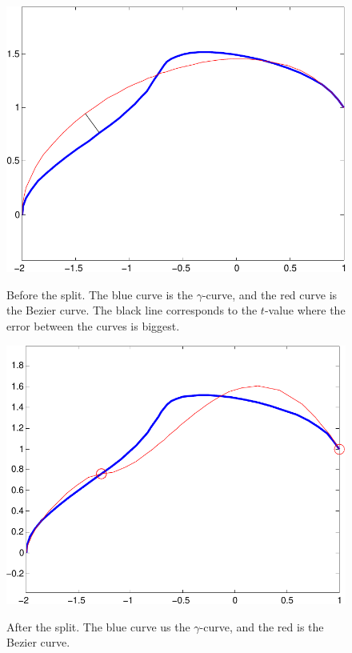 \documentclass[10pt]{article}
\begin{document}
\begin{figure}
\centering
\begin{minipage}[t]{.4\textwidth}
\centering
\vspace{0pt}
    \includegraphics[scale=0.5]{kurvedeling1-crop.pdf}
    \label{fig:kurvedeling1}
    \caption{Before the split. The blue curve is the $\gamma$-curve, and the red curve is the Bezier curve. The black line corresponds to the $t$-value where the error between the curves is biggest.}
\end{minipage}\hfill
\begin{minipage}[t]{.4\textwidth}
\centering
\vspace{0pt}
    \includegraphics[scale=0.5]{kurvedeling2-crop.pdf}
    \label{fig:kurvedeling2}
    \caption{After the split. The blue curve us the $\gamma$-curve, and the red is the Bezier curve.}
\end{minipage}
\end{figure}
\end{document}

